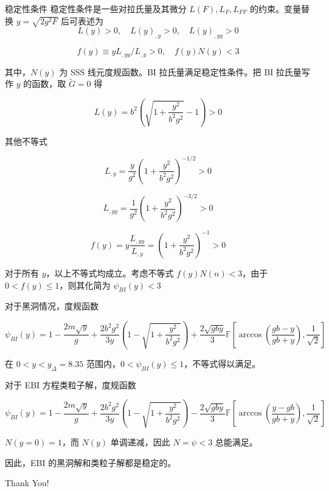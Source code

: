 \documentclass[9pt, dvipsnames]{beamer} %
\begin{document}
\begin{frame}{稳定性条件}
    稳定性条件是一些对拉氏量及其微分 $L(F),L_F,L_{FF}$ 的约束。变量替换 $y=\sqrt{2g^2 F}$ 后可表述为
    $$
    L(y)>0,\quad
    L(y)_{,y}>0,\quad
    L(y)_{,yy}>0 
    $$

    $$
    f(y)
    \equiv yL_{,yy} / L_{,y} > 0,\quad
    f(y) N(y) < 3    
    $$

    其中，$N(y)$ 为 SSS 线元度规函数。BI 拉氏量满足稳定性条件。把 BI 拉氏量写作 $y$ 的函数，取 $\tilde{G}=0$ 得

    $$
    L(y)
    =b^2\left(\sqrt{1+\frac{y^2 }{b^2 g^2 } } - 1 \right) > 0 
    $$

    其他不等式
    
    $$
    L_{,y} = \frac{y }{g^2 } \left(1 + \frac{y^2 }{b^2 g^2 }  \right)^{-1/2} > 0
    $$

    $$
    L_{,yy} = \frac{1 }{g^2 } \left(1 + \frac{y^2 }{b^2 g^2 }  \right)^{-3/2} > 0
    $$

    $$
    f(y) = y\frac{L_{,yy} }{L_{,y} } = \left(1 + \frac{y^2 }{b^2 g^2 }  \right)^{-1} > 0
    $$

\end{frame}

\begin{frame}
    对于所有 $y$，以上不等式均成立。考虑不等式 $f(y)N(n)<3$，由于 $0<f(y)\leqslant 1$，则其化简为 $\psi_{BI}(y)<3$

    对于黑洞情况，度规函数

    $$
    \psi_{BI}(y)
    =1-\frac{2m\sqrt{y} }{g } + \frac{2b^2 g^2 }{3y } \left(1-\sqrt{1+\frac{y^2 }{b^2 g^2 } } \right) + \frac{2\sqrt{gby} }{3 } \mathbb{F}\left[\arccos\left(\frac{gb-y }{gb+y } \right), \frac{1 }{\sqrt{2} }   \right] 
    $$

    在 $0<y<y_\Delta=8.35$ 范围内，$0<\psi_{BI}(y)\leqslant 1$，不等式得以满足。

    对于 EBI 方程类粒子解，度规函数

    $$
    \psi_{BI}(y)
    =1-\frac{2m\sqrt{y} }{g } + \frac{2b^2 g^2 }{3y } \left(1-\sqrt{1+\frac{y^2 }{b^2 g^2 } } \right) - \frac{2\sqrt{gby} }{3 } \mathbb{F}\left[\arccos\left(\frac{y-gb }{gb+y } \right), \frac{1 }{\sqrt{2} } \right]
    $$

    $N(y=0)=1$，而 $N(y)$ 单调递减，因此 $N=\psi<3$ 总能满足。

    因此，EBI 的黑洞解和类粒子解都是稳定的。

\end{frame}
    
\begin{frame}[noframenumbering]
    \centering
    {\fontsize{40}{50}\selectfont Thank You!}
\end{frame}
\end{document}
